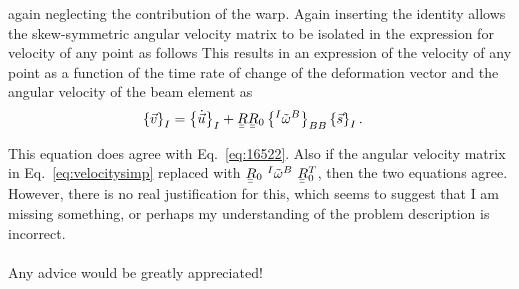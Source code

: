 \documentclass[a4paper]{article}
\newcommand{\ubar}[1]{\underaccent{\bar}{#1}}
\begin{document}
again neglecting the contribution of the warp.  Again inserting the identity allows the skew-symmetric angular velocity matrix to be isolated in the expression for velocity of any point as follows 
This results in an expression of the velocity of any point as a function of the time rate of change of the deformation vector and the angular velocity of the beam element as   
\begin{align}
  \left\{ \vec{v} \right\}_{I}
  &= \left\{ \dot{ \vec{u}}\right\}_{I}
  + \ubar{\ubar{R}} \ubar{\ubar{R}}_{0} \left\{ ^{I}\tilde{\omega}^{B} \right\}_{BB} \left\{ \vec{s} \right\}_{I}.
  \label{eq:velocitysimp2}
\end{align}

This equation does agree with Eq.~\eqref{eq:16522}.  Also if the angular velocity matrix in Eq.~\eqref{eq:velocitysimp} replaced with $\ubar{\ubar{R}}_{0} \ ^{I}\tilde{\omega}^{B} \ \ubar{\ubar{R}}_{0}^{T}$, then the two equations agree.  However, there is no real justification for this, which seems to suggest that I am missing something, or perhaps my understanding of the problem description is incorrect.  
\\ \\
Any advice would be greatly appreciated!  
\end{document}
